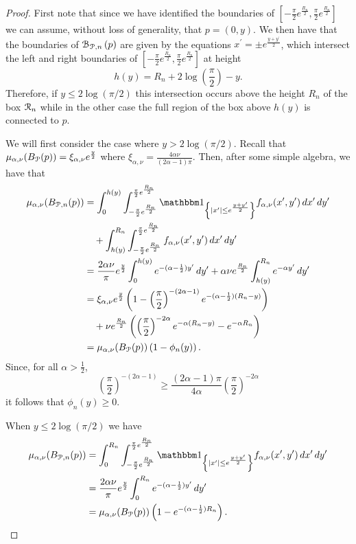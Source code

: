 \begin{proof}
First note that since we have identified the boundaries of $[-\frac{\pi}{2}e^{\frac{R_n}{2}}, \frac{\pi}{2}e^{\frac{R_n}{2}}]$ we can assume, without loss of generality, that $p = (0,y)$. We then have that the boundaries of ${\mathcal B}_{{\mathcal P},n}\left(p\right)$ are given by the equations $x^\prime = \pm e^{\frac{y+y^\prime}{2}}$, which intersect the left and right boundaries of $[-\frac{\pi}{2}e^{\frac{R_n}{2}}, \frac{\pi}{2}e^{\frac{R_n}{2}}]$ at height
\[
	h(y) = R_n + 2 \log\left(\frac{\pi}{2}\right) - y.
\]
Therefore, if $y \le 2 \log(\pi/2)$ this intersection occurs above the height $R_n$ of the box ${\mathcal R}_n$ while in the other case the full region of the box above $h(y)$ is connected to $p$. 

We will first consider the case where $y > 2 \log(\pi/2)$. Recall that $\mu_{\alpha,\nu}(B_{{\mathcal P}}(p)) = \xi_{\alpha,\nu}e^{\frac{y}{2}}$ where $\xi_{\alpha,\nu} = \frac{4\alpha \nu}{(2\alpha - 1)\pi}$. Then, after some simple algebra, we have that
\begin{align*}
	\mu_{\alpha,\nu}(B_{\Pcal,n}(p))
	&= \int_0^{h(y)} \int_{-\frac{\pi}{2}e^{\frac{R_n}{2}}}^{\frac{\pi}{2}e^{\frac{R_n}{2}}} 
		\ind{|x^\prime| \le e^{\frac{y+y^\prime}{2}}} f_{\alpha,\nu}(x^\prime,y^\prime) \, dx^\prime \, dy^\prime\\
	&\hspace{10pt}+ \int_{h(y)}^{R_n} \int_{-\frac{\pi}{2}e^{\frac{R_n}{2}}}^{\frac{\pi}{2}e^{\frac{R_n}{2}}} 
		f_{\alpha,\nu}(x^\prime,y^\prime) \, dx^\prime \, dy^\prime\\
	&= \frac{2 \alpha \nu}{\pi} e^{\frac{y}{2}} \int_0^{h(y)} e^{-(\alpha - \frac{1}{2})y^\prime} \, dy^\prime
		+ \alpha \nu e^{\frac{R_n}{2}} \int_{h(y)}^{R_n} e^{-\alpha y^\prime} \, dy^\prime \\
	&= \xi_{\alpha,\nu} e^{\frac{y}{2}}\left(1 - \left(\frac{\pi}{2}\right)^{-(2\alpha - 1)} 
		e^{-(\alpha - \frac{1}{2})(R_n - y)}\right)\\
	&\hspace{10pt}+ \nu e^{\frac{R_n}{2}}\left(\left(\frac{\pi}{2}\right)^{-2\alpha} e^{-\alpha(R_n - y)} 
		- e^{-\alpha R_n}\right)\\
	&= \mu_{\alpha,\nu}(B_\Pcal(p))\left(1 - \phi_n(y)\right).
\end{align*}
Since, for all $\alpha > \frac{1}{2}$,
\[
	\left(\frac{\pi}{2}\right)^{-(2\alpha - 1)} \ge \frac{(2\alpha - 1)\pi}{4\alpha} \left(\frac{\pi}{2}\right)^{-2\alpha}
\]
it follows that $\phi_n(y) \ge 0$.

When $y \le 2 \log(\pi/2)$ we have
\begin{align*}
	\mu_{\alpha,\nu}(B_{\Pcal,n}(p))
	&= \int_0^{R_n} \int_{-\frac{\pi}{2}e^{\frac{R_n}{2}}}^{\frac{\pi}{2}e^{\frac{R_n}{2}}} 
		\ind{|x^\prime| \le e^{\frac{y+y^\prime}{2}}} f_{\alpha,\nu}(x^\prime,y^\prime) \, dx^\prime \, dy^\prime\\
	&= \frac{2 \alpha \nu}{\pi} e^{\frac{y}{2}} \int_0^{R_n} e^{-(\alpha - \frac{1}{2})y^\prime} \, dy^\prime\\
	&= \mu_{\alpha,\nu}(B_\Pcal(p))\left(1 - e^{-(\alpha - \frac{1}{2})R_n}\right).
\end{align*}
\end{proof}

